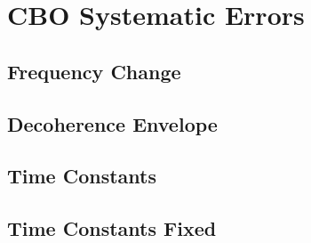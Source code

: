 
\graphicspath{{Body/Figures/CBO/}}

\section{CBO Systematic Errors}

\subsection{Frequency Change}

\subsection{Decoherence Envelope}

\subsection{Time Constants}

\subsection{Time Constants Fixed}
